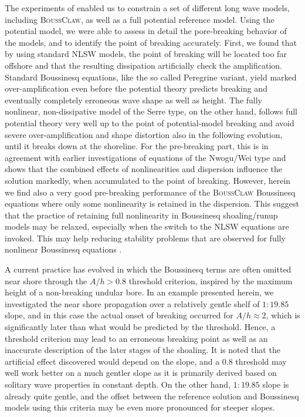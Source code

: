 \documentclass[review]{elsarticle}
\newcommand{\BoussClaw}{\textsc{BoussClaw} }
\newcommand{\BoussClawt}{\textsc{BoussClaw}}
\begin{document}
The experiments of \citet{synolakis1987runup} enabled us to
constrain a set of different long wave models, including \BoussClawt, as well as a full potential reference model. Using the potential  model, we were able to assess in detail the pore-breaking behavior of the models,
and to identify the point of breaking accurately. 
First, we found that by using standard NLSW models,
the point of breaking will be located too far offshore and that the resulting dissipation 
artificially check the amplification. Standard Boussinesq equations, like the 
so called Peregrine variant, yield marked over-amplification even before the potential theory predicts breaking and eventually completely erroneous wave shape as well as height.
The fully nonlinear, non-dissipative model of the Serre type, on the other hand, follows full potential theory very well up to the point of potential-model breaking and avoid severe over-amplification and shape distortion also in the following evolution, until it breaks down at the shoreline. For the pre-breaking part, this is in agreement with earlier investigations of equations of the Nwogu/Wei type \citep{Wei95} and shows that
the combined effects of nonlinearities and dispersion influence the solution markedly, when accumulated to the point
of breaking. 
However, herein we find also a very good pre-breaking performance of 
the \BoussClaw Boussinesq equations 
where only some nonlinearity is retained in the dispersion. 
This suggest that the practice of retaining full nonlinearity 
in Boussinesq shoaling/runup models 
may be relaxed, especially when the switch to the NLSW equations are invoked. 
This may help reducing stability problems 
that are observed for fully nonlinear Boussinesq equations \citep{Lovholt:2013a}.
    
A current practice has evolved in which the Boussinesq terms are often omitted near shore through the $A/h>0.8$ threshold criterion, inspired by the maximum height of a non-breaking 
undular bore. 
In an example presented herein, we investigated the near shore propagation over a relatively gentle shelf of $1:19.85$ slope,
and in this case the actual onset of breaking occurred for $A/h \approx 2$, which is significantly later
than what would be predicted by the threshold.  
Hence, a  threshold criterion may lead to an erroneous breaking point as well as an 
inaccurate description of the later stages of the shoaling.
It is noted that the artificial effect discovered would depend on the slope, 
and a $0.8$ threshold may well work better on a much gentler slope as it is primarily derived based on 
solitary wave properties in constant depth. On the other hand, $1:19.85$ slope is already quite gentle,
and the offset between the reference solution and Boussinesq models using this criteria may
be even more pronounced for steeper slopes.
\end{document}
